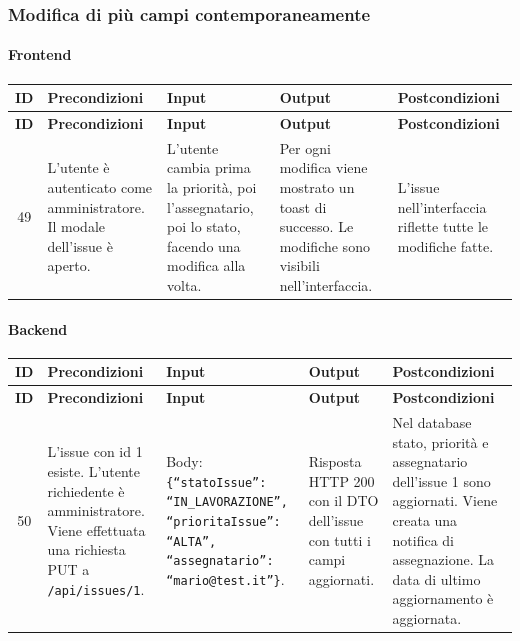 \subsubsection{Modifica di pi\`u campi contemporaneamente}

\paragraph{Frontend}

{
\small
\begin{longtable}{|c|p{3.8cm}|p{3.8cm}|p{3.8cm}|p{3.8cm}|}
\hline
\textbf{ID} & \textbf{Precondizioni} & \textbf{Input} & \textbf{Output} & \textbf{Postcondizioni} \\
\hline
\endfirsthead
\hline
\textbf{ID} & \textbf{Precondizioni} & \textbf{Input} & \textbf{Output} & \textbf{Postcondizioni} \\
\hline
\endhead
49 &
L'utente \`e autenticato come amministratore. Il modale dell'issue \`e aperto. &
L'utente cambia prima la priorit\`a, poi l'assegnatario, poi lo stato, facendo una modifica alla volta. &
Per ogni modifica viene mostrato un toast di successo. Le modifiche sono visibili nell'interfaccia. &
L'issue nell'interfaccia riflette tutte le modifiche fatte. \\
\hline
\end{longtable}
}

\paragraph{Backend}

{
\small
\begin{longtable}{|c|p{3.8cm}|p{3.8cm}|p{3.8cm}|p{3.8cm}|}
\hline
\textbf{ID} & \textbf{Precondizioni} & \textbf{Input} & \textbf{Output} & \textbf{Postcondizioni} \\
\hline
\endfirsthead
\hline
\textbf{ID} & \textbf{Precondizioni} & \textbf{Input} & \textbf{Output} & \textbf{Postcondizioni} \\
\hline
\endhead
50 &
L'issue con id 1 esiste. L'utente richiedente \`e amministratore. Viene effettuata una richiesta PUT a \texttt{/api/issues/1}. &
Body: \texttt{\{``statoIssue'': ``IN\_LAVORAZIONE'', ``prioritaIssue'': ``ALTA'', ``assegnatario'': ``mario@test.it''\}}. &
Risposta HTTP 200 con il DTO dell'issue con tutti i campi aggiornati. &
Nel database stato, priorit\`a e assegnatario dell'issue 1 sono aggiornati. Viene creata una notifica di assegnazione. La data di ultimo aggiornamento \`e aggiornata. \\
\hline
\end{longtable}
}

